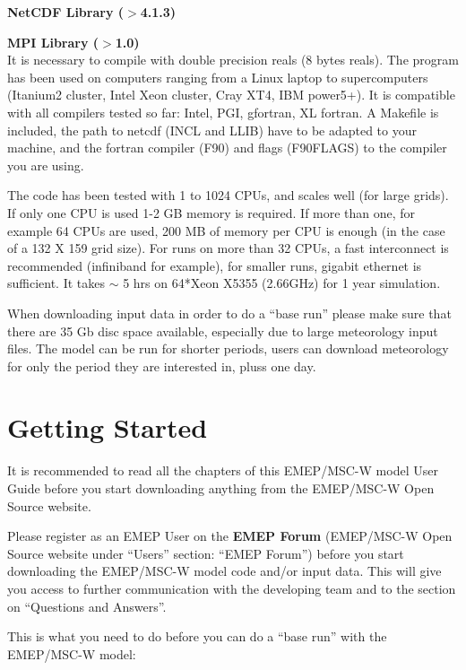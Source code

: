 \textbf{NetCDF Library ($>$4.1.3)}

\textbf{MPI Library ($>$1.0)}\\

It is necessary to compile with double precision reals (8 bytes
reals). The program has been used on computers ranging from a Linux laptop to supercomputers 
(Itanium2 cluster, Intel Xeon cluster, Cray XT4, IBM power5+). It is compatible with all 
compilers tested so far:  Intel, PGI, gfortran, XL fortran. A Makefile is included,  
the path to netcdf (INCL and LLIB) have to be adapted to your machine, and the fortran 
compiler (F90) and flags (F90FLAGS) to the compiler you are using.



The code has been tested with 1 to 1024 CPUs, and scales well (for large grids).  If only one 
CPU is used 1-2 GB memory is required. If more than one,
for example 64 CPUs are used, 200 MB of memory per CPU is enough (in
the case of a 132 X 159 grid size). For runs on more than 32 CPUs, a fast interconnect is 
recommended (infiniband for example), for smaller runs, gigabit ethernet is sufficient. 
It takes $\sim$ 5 hrs on 64*Xeon X5355 (2.66GHz) for 1 year simulation.

When downloading input data in order to do a ``base run'' please make
sure that there are 35 Gb disc space available, especially due to
large meteorology input files. The model can be run for shorter periods, users 
can download meteorology for only the period they are interested in, pluss one day. 
 

\section{Getting Started}


It is recommended to read all the chapters of this EMEP/MSC-W model
User Guide before you start downloading anything from the EMEP/MSC-W Open
Source website.

Please register as an EMEP User on the {\bf EMEP Forum}
(EMEP/MSC-W Open Source website under ``Users'' section: ``EMEP Forum'')
before you start downloading the EMEP/MSC-W model code and/or input
data. This will give you access to further communication with the
developing team and to the section on ``Questions and Answers''. 


This is what you need to do before you can do a ``base run'' with the 
EMEP/MSC-W model:

